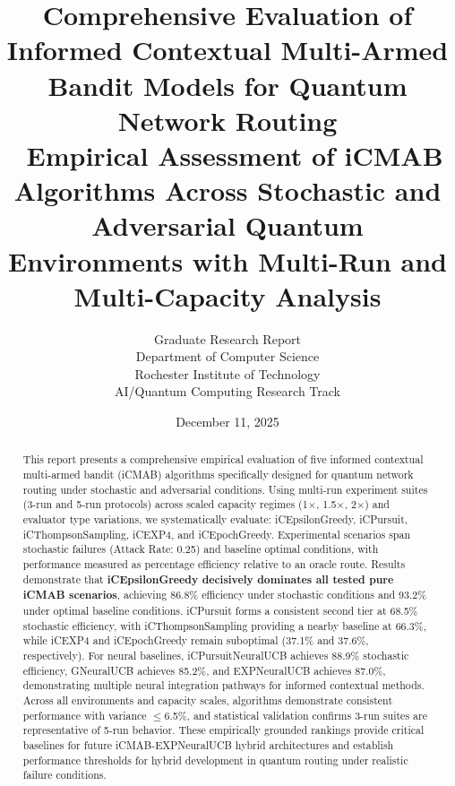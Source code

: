 \documentclass[12pt,a4paper]{article}
\title{\textbf{Comprehensive Evaluation of Informed Contextual Multi-Armed Bandit Models for Quantum Network Routing}\\\
\large{Empirical Assessment of iCMAB Algorithms Across Stochastic and Adversarial Quantum Environments with Multi-Run and Multi-Capacity Analysis}}
\author{Graduate Research Report\\
Department of Computer Science\\
Rochester Institute of Technology\\
AI/Quantum Computing Research Track}
\date{December 11, 2025}
\newcommand{\primarytext}[1]{\textcolor{primaryblue}{\textbf{#1}}}
\begin{document}
\maketitle

\begin{abstract}
This report presents a comprehensive empirical evaluation of five informed contextual multi-armed bandit (iCMAB) algorithms specifically designed for quantum network routing under stochastic and adversarial conditions. Using multi-run experiment suites (3-run and 5-run protocols) across scaled capacity regimes (1$\times$, 1.5$\times$, 2$\times$) and evaluator type variations, we systematically evaluate: iCEpsilonGreedy, iCPursuit, iCThompsonSampling, iCEXP4, and iCEpochGreedy. Experimental scenarios span stochastic failures (Attack Rate: 0.25) and baseline optimal conditions, with performance measured as percentage efficiency relative to an oracle route. Results demonstrate that \primarytext{iCEpsilonGreedy decisively dominates all tested pure iCMAB scenarios}, achieving 86.8\% efficiency under stochastic conditions and 93.2\% under optimal baseline conditions. iCPursuit forms a consistent second tier at 68.5\% stochastic efficiency, with iCThompsonSampling providing a nearby baseline at 66.3\%, while iCEXP4 and iCEpochGreedy remain suboptimal (37.1\% and 37.6\%, respectively). For neural baselines, iCPursuitNeuralUCB achieves 88.9\% stochastic efficiency, GNeuralUCB achieves 85.2\%, and EXPNeuralUCB achieves 87.0\%, demonstrating multiple neural integration pathways for informed contextual methods. Across all environments and capacity scales, algorithms demonstrate consistent performance with variance $\leq$6.5\%, and statistical validation confirms 3-run suites are representative of 5-run behavior. These empirically grounded rankings provide critical baselines for future iCMAB-EXPNeuralUCB hybrid architectures and establish performance thresholds for hybrid development in quantum routing under realistic failure conditions.
\end{abstract}

\newpage
\tableofcontents

\newpage
\end{document}
